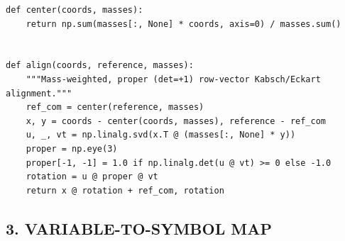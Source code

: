\documentclass[10pt,a4paper]{article}
\begin{document}
\begin{Verbatim}
def center(coords, masses):
    return np.sum(masses[:, None] * coords, axis=0) / masses.sum()


def align(coords, reference, masses):
    """Mass-weighted, proper (det=+1) row-vector Kabsch/Eckart alignment."""
    ref_com = center(reference, masses)
    x, y = coords - center(coords, masses), reference - ref_com
    u, _, vt = np.linalg.svd(x.T @ (masses[:, None] * y))
    proper = np.eye(3)
    proper[-1, -1] = 1.0 if np.linalg.det(u @ vt) >= 0 else -1.0
    rotation = u @ proper @ vt
    return x @ rotation + ref_com, rotation
\end{Verbatim}
\subsection{3. VARIABLE-TO-SYMBOL MAP}
\begingroup\footnotesize
\end{document}
